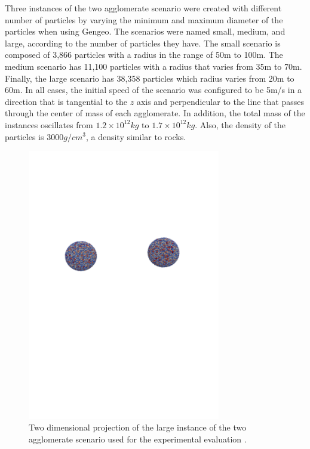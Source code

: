 \documentclass[runningheads]{llncs}
\begin{document}
Three instances of the two agglomerate scenario were created with different number of particles by varying the minimum and maximum diameter of the particles when using Gengeo. The scenarios were named small, medium, and large, according to the number of particles they have. The small scenario is composed of 3,866 particles with a radius in the range of 50m to 100m. The medium scenario has 11,100 particles with a radius that varies from 35m to 70m. Finally, the large scenario has 38,358 particles which radius varies from 20m to 60m. In all cases, the initial speed of the scenario was configured to be 5m/s in a direction that is tangential to the $z$ axis and perpendicular to the line that passes through the center of mass of each agglomerate. In addition, the total mass of the instances oscillates from $1.2\times10^12 kg$ to $1.7\times10^12 kg$. Also, the density of the particles is $3000 g/cm^3$, a density similar to rocks. 

\begin{figure}[!h]
\setlength{\abovecaptionskip}{3pt}
   	\centering
	\includegraphics[frame, trim = 30mm 115mm 30mm 45mm, clip, width=0.75\textwidth]{2aglo.png}
	\caption{Two dimensional projection of the large instance of the two agglomerate scenario used for the experimental evaluation
	.}
	\label{fig:2aglo}
\end{figure}
\end{document}
